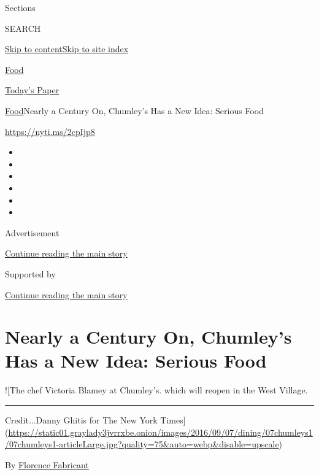 Sections

SEARCH

\protect\hyperlink{site-content}{Skip to
content}\protect\hyperlink{site-index}{Skip to site index}

\href{https://www.nytimes3xbfgragh.onion/section/food}{Food}

\href{https://myaccount.nytimes3xbfgragh.onion/auth/login?response_type=cookie\&client_id=vi}{}

\href{https://www.nytimes3xbfgragh.onion/section/todayspaper}{Today's
Paper}

\href{/section/food}{Food}\textbar{}Nearly a Century On, Chumley's Has a
New Idea: Serious Food

\url{https://nyti.ms/2cpIjp8}

\begin{itemize}
\item
\item
\item
\item
\item
\item
\end{itemize}

Advertisement

\protect\hyperlink{after-top}{Continue reading the main story}

Supported by

\protect\hyperlink{after-sponsor}{Continue reading the main story}

\hypertarget{nearly-a-century-on-chumleys-has-a-new-idea-serious-food}{%
\section{Nearly a Century On, Chumley's Has a New Idea: Serious
Food}\label{nearly-a-century-on-chumleys-has-a-new-idea-serious-food}}

!{[}The chef Victoria Blamey at Chumley's. which will reopen in the West
Village.

\begin{center}\rule{0.5\linewidth}{\linethickness}\end{center}

Credit...Danny Ghitis for The New York
Times{]}(\url{https://static01.graylady3jvrrxbe.onion/images/2016/09/07/dining/07chumleys1/07chumleys1-articleLarge.jpg?quality=75\&auto=webp\&disable=upscale})

By
\href{http://www.nytimes3xbfgragh.onion/by/florence-fabricant}{Florence
Fabricant}

